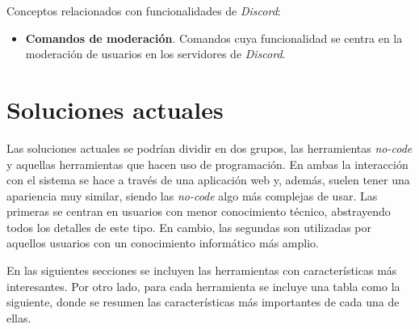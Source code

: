 Conceptos relacionados con funcionalidades de \textit{Discord}:

\begin{itemize}
    \item \textbf{Comandos de moderación}. Comandos cuya funcionalidad se centra en la moderación de usuarios en los servidores de \textit{Discord}.
\end{itemize}

\section{Soluciones actuales}

Las soluciones actuales se podrían dividir en dos grupos, las herramientas \textit{no-code} y aquellas herramientas que hacen uso de programación. En ambas la interacción con el sistema se hace a través de una aplicación web y, además, suelen tener una apariencia muy similar, siendo las \textit{no-code} algo más complejas de usar. Las primeras se centran en usuarios con menor conocimiento técnico, abstrayendo todos los detalles de este tipo. En cambio, las segundas son utilizadas por aquellos usuarios con un conocimiento informático más amplio.

En las siguientes secciones se incluyen las herramientas con características más interesantes. Por otro lado, para cada herramienta se incluye una tabla como la siguiente, donde se resumen las características más importantes de cada una de ellas.

